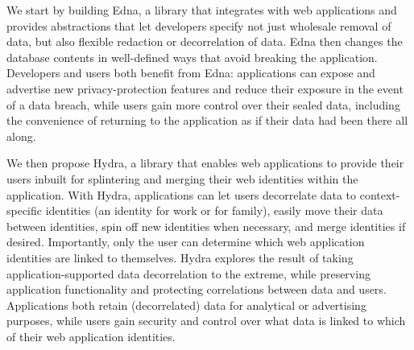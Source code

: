 We start by building Edna, a library that integrates with web applications and
provides abstractions that let developers specify not just wholesale removal of
data, but also flexible redaction or decorrelation of data. Edna then changes
the database contents in well-defined ways that avoid breaking the application.
Developers and users both benefit from Edna: applications can expose and
advertise new privacy-protection features and reduce their exposure in the event
of a data breach, while users gain more control over their sealed data,
including the convenience of returning to the application as if their data had
been there all along.

We then propose Hydra, a library that enables web applications to provide their
users inbuilt for splintering and merging their web identities within the
application. With Hydra, applications can let users decorrelate data to
context-specific identities (\eg an identity for work or for family), easily
move their data between identities, spin off new identities when necessary, and
merge identities if desired. Importantly, only the user can determine which
web application identities are linked to themselves.
%
Hydra explores the result of taking application-supported data
decorrelation to the extreme, while preserving application functionality and
protecting correlations between data and users. Applications both retain
(decorrelated) data for \eg analytical or advertising purposes, while users gain
security and control over what data is linked to which of their web application
identities.

\begin{comment}
\section{Related Work}
\label{sec:intro:related}

\section{Approach}
\label{sec:intro:approach}


\section{Contributions}
\label{sec:intro:contributions}


\section{Reading Guide}
\label{sec:intro:reading-guide}
\end{comment}

